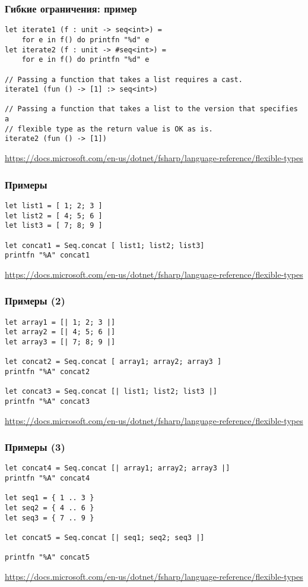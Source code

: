\documentclass[xetex,mathserif,serif]{beamer}
\newcommand{\attribution}[1] {
    \begin{flushright}\begin{scriptsize}\textcolor{gray}{#1}\end{scriptsize}\end{flushright}
}
\begin{document}
    \begin{frame}[fragile]
        \frametitle{Гибкие ограничения: пример}
        \begin{verbatim}
let iterate1 (f : unit -> seq<int>) =
    for e in f() do printfn "%d" e
let iterate2 (f : unit -> #seq<int>) =
    for e in f() do printfn "%d" e

// Passing a function that takes a list requires a cast.
iterate1 (fun () -> [1] :> seq<int>)

// Passing a function that takes a list to the version that specifies a
// flexible type as the return value is OK as is.
iterate2 (fun () -> [1])
        \end{verbatim}
        \attribution{\url{https://docs.microsoft.com/en-us/dotnet/fsharp/language-reference/flexible-types}}
    \end{frame}

    \begin{frame}[fragile]
        \frametitle{Примеры}
        \begin{verbatim}
let list1 = [ 1; 2; 3 ]
let list2 = [ 4; 5; 6 ]
let list3 = [ 7; 8; 9 ]

let concat1 = Seq.concat [ list1; list2; list3]
printfn "%A" concat1
        \end{verbatim}
        \attribution{\url{https://docs.microsoft.com/en-us/dotnet/fsharp/language-reference/flexible-types}}
    \end{frame}

    \begin{frame}[fragile]
        \frametitle{Примеры (2)}
        \begin{verbatim}
let array1 = [| 1; 2; 3 |]
let array2 = [| 4; 5; 6 |]
let array3 = [| 7; 8; 9 |]

let concat2 = Seq.concat [ array1; array2; array3 ]
printfn "%A" concat2

let concat3 = Seq.concat [| list1; list2; list3 |]
printfn "%A" concat3
        \end{verbatim}
        \attribution{\url{https://docs.microsoft.com/en-us/dotnet/fsharp/language-reference/flexible-types}}
    \end{frame}

    \begin{frame}[fragile]
        \frametitle{Примеры (3)}
        \begin{verbatim}
let concat4 = Seq.concat [| array1; array2; array3 |]
printfn "%A" concat4

let seq1 = { 1 .. 3 }
let seq2 = { 4 .. 6 }
let seq3 = { 7 .. 9 }

let concat5 = Seq.concat [| seq1; seq2; seq3 |]

printfn "%A" concat5
        \end{verbatim}
        \attribution{\url{https://docs.microsoft.com/en-us/dotnet/fsharp/language-reference/flexible-types}}
    \end{frame}
\end{document}
